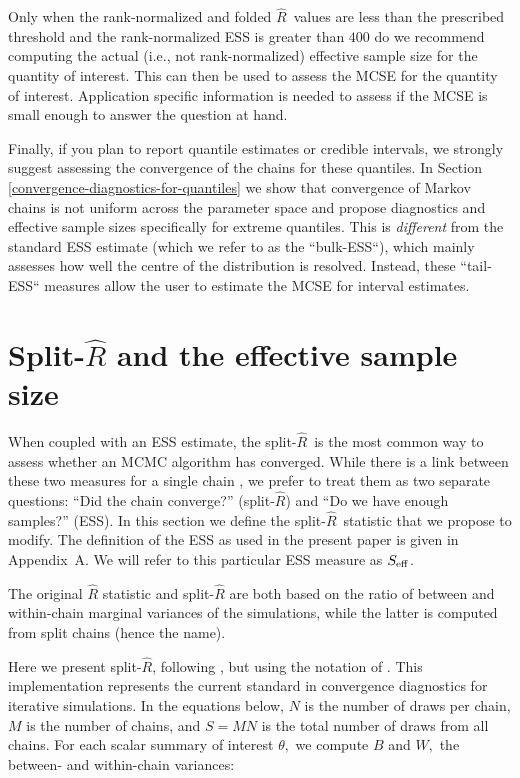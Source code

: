 \documentclass[american,]{article}
\newcommand{\Rhat}{$\widehat{R}$}
\newcommand{\sRhat}{split-$\widehat{R}$}
\theoremstyle{definition}
\begin{document}
Only when the rank-normalized and folded \Rhat\ values are less than the
prescribed threshold and the rank-normalized ESS is greater than $400$ do we recommend
computing the actual (i.e., not rank-normalized) effective sample size for the 
quantity of interest. This can then be used to assess the MCSE for the quantity
of interest. Application specific information is needed to 
assess if the MCSE is small enough to answer the question at hand.

Finally, if you plan to report quantile estimates or credible intervals, we 
strongly suggest assessing the convergence of the chains for these quantiles.
In Section \ref{convergence-diagnostics-for-quantiles} we show that
convergence of Markov chains is not uniform across the parameter space
and propose diagnostics and effective sample sizes specifically for extreme 
quantiles. This is \emph{different} from the standard ESS estimate (which 
we refer to as the ``bulk-ESS``), which mainly assesses how well
the centre of the distribution is resolved. Instead, these ``tail-ESS`` 
measures allow the user to estimate the MCSE for interval estimates.


\hypertarget{SplitRhat}{%
\section{Split-$\widehat{R}$ and the effective sample size}\label{SplitRhat}}

When coupled with an ESS estimate, the  \sRhat\ is the most common way to
assess whether an MCMC algorithm has converged.  While there is a link between
these two measures  for a single chain \citep{vats2018revisiting}, we prefer to 
treat them as two separate questions: ``Did the chain converge?'' (\sRhat) and 
``Do we have enough samples?'' (ESS).  In this section we define the \sRhat\ 
statistic that we propose to modify. 
The definition of the ESS as used in the present paper is given in Appendix~A.
We will refer to this particular ESS measure as \(S_{\rm eff}\).

The original \(\widehat{R}\) statistic
\citep{Gelman+Rubin:1992, Brooks+Gelman:1998} and
split-\(\widehat{R}\) \citep{BDA3} are both based on the ratio of
between and within-chain marginal variances of the simulations, while
the latter is computed from split chains (hence the name).

Here we present split-\(\widehat{R}\),
following \citet{BDA3}, but using the notation of
\citet{StanBook}. This implementation represents the current 
standard in convergence diagnostics for iterative simulations. In the
equations below, \(N\) is the number of draws per chain, \(M\) is the
number of chains, and \(S=MN\) is the total number of draws from all
chains. For each scalar summary of interest \(\theta,\) we compute \(B\)
and \(W,\) the between- and within-chain variances:
\end{document}
